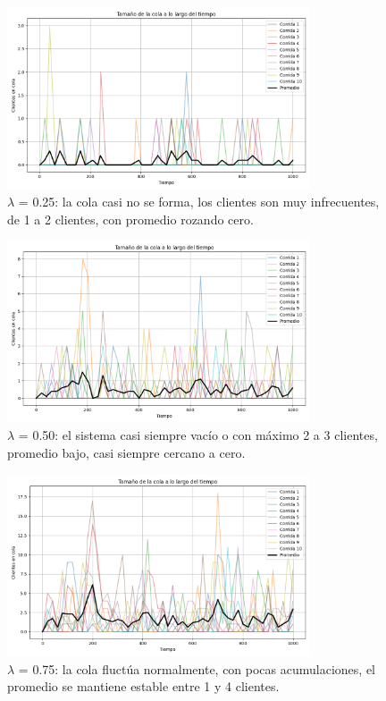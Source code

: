 \documentclass{article}
\begin{document}
    \begin{figure}[h!]
        \centering
        \includegraphics[width=0.8\textwidth]{Imagenes/MM1/cola_vs_tiempo_0.25_infinita.png}
        \caption{\( \lambda \) = 0.25: la cola casi no se forma, los clientes son muy infrecuentes, de 1 a 2 clientes, con promedio rozando cero.}
        \label{fig:ejemplo}
    \end{figure}
    \begin{figure}[h!]
        \centering
        \includegraphics[width=0.8\textwidth]{Imagenes/MM1/cola_vs_tiempo_0.5_infinita.png}
        \caption{\( \lambda \) = 0.50:  el sistema casi siempre vacío o con máximo 2 a 3 clientes, promedio bajo, casi siempre cercano a cero.}
        \label{fig:ejemplo}
    \end{figure}
    \begin{figure}[h!]
        \centering
        \includegraphics[width=0.8\textwidth]{Imagenes/MM1/cola_vs_tiempo_0.75_infinita.png}
        \caption{\( \lambda \) = 0.75: la cola fluctúa normalmente, con pocas acumulaciones, el promedio se mantiene estable entre 1 y 4 clientes.}
        \label{fig:ejemplo}
    \end{figure}
\end{document}
